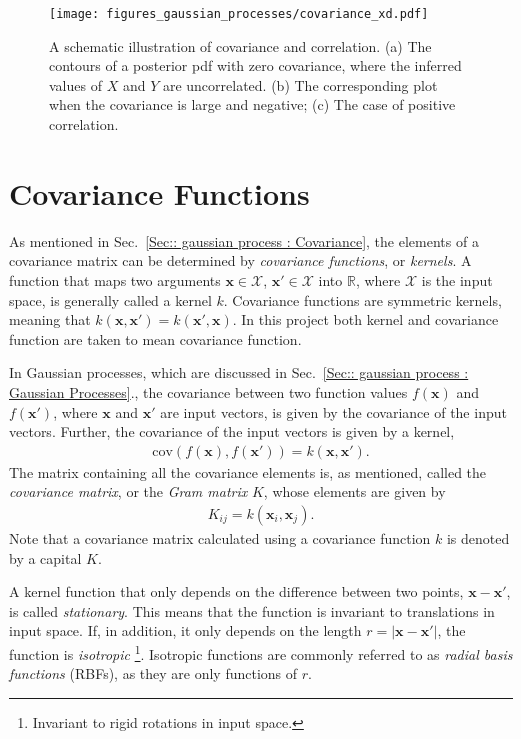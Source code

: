 \documentclass[twoside,english]{uiofysmaster}
\begin{document}
\begin{figure}
\centering
\texttt{[image: figures\_gaussian\_processes/covariance\_xd.pdf]}
\caption{A schematic illustration of covariance and correlation. (a) The contours of a posterior pdf with zero covariance, where the inferred values of $X$ and $Y$ are uncorrelated. (b) The corresponding plot when the covariance is large and negative; (c) The case of positive correlation.}
\label{Fig:: gaussian process : Covariance illustrated}
\end{figure}


\section{Covariance Functions}\label{Sec:: gaussian processes : Covariance functions}


As mentioned in Sec.~\ref{Sec:: gaussian process : Covariance}, the elements of a covariance matrix can be determined by \textit{covariance functions}, or \textit{kernels}. A function that maps two arguments $\textbf{x} \in \mathcal{X}$, $\textbf{x}' \in \mathcal{X}$ into $\mathbb{R}$, where $\mathcal{X}$ is the input space, is generally called a kernel $k$. Covariance functions are symmetric kernels, meaning that $k(\textbf{x}, \textbf{x}') = k(\textbf{x}', \textbf{x})$. In this project both kernel and covariance function are taken to mean covariance function. 

In Gaussian processes, which are discussed in Sec.~\ref{Sec:: gaussian process : Gaussian Processes}., the covariance between two function values $f(\textbf{x})$ and $f(\textbf{x}')$, where $\textbf{x}$ and $\textbf{x}'$ are input vectors, is given by the covariance of the input vectors. Further, the covariance of the input vectors is given by a kernel, 
\begin{align}
\text{cov}(f(\textbf{x}), f(\textbf{x}')) = k(\textbf{x}, \textbf{x}').
\end{align}
The matrix containing all the covariance elements is, as mentioned, called the \textit{covariance matrix}, or the \textit{Gram matrix} $K$, whose elements are given by
\begin{align}\label{Eq:: covariance matrix}
K_{ij} = k(\textbf{x}_i, \textbf{x}_j).
\end{align}
Note that a covariance matrix calculated using a covariance function $k$ is denoted by a capital $K$.

A kernel function that only depends on the difference between two points, $\textbf{x}-\textbf{x}'$, is called \textit{stationary}. This means that the function is invariant to translations in input space. If, in addition, it only depends on the length $r=|\textbf{x}-\textbf{x}'|$, the function is \textit{isotropic} \footnote{Invariant to rigid rotations in input space.}.  Isotropic functions are commonly referred to as \textit{radial basis functions} (RBFs), as they are only functions of $r$. 
\end{document}
